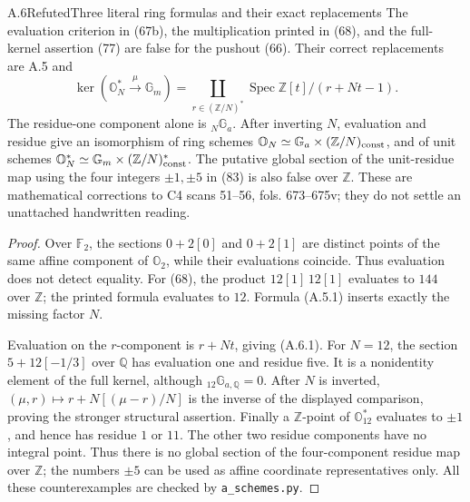 \begin{statement}{A.6}{Refuted}{Three literal ring formulas and their exact replacements}
The evaluation criterion in (67b), the multiplication printed in (68),
and the full-kernel assertion (77) are false for the pushout (66).
Their correct replacements are A.5 and
\[
 \ker(\mathbb O_N^*\xrightarrow{\mu}\mathbb G_m)
 =\coprod_{r\in(\mathbb Z/N)^*}
   \operatorname{Spec}\mathbb Z[t]/(r+Nt-1).           \tag{A.6.1}
\]
The residue-one component alone is ${}_N\mathbb G_a$.
After inverting $N$, evaluation and residue give an isomorphism of
ring schemes
$\mathbb O_N\simeq\mathbb G_a\times(\mathbb Z/N)_{\rm const}$,
and of unit schemes
$\mathbb O_N^*\simeq\mathbb G_m\times(\mathbb Z/N)^*_{\rm const}$.
The putative global section of the unit-residue map using the four
integers $\pm1,\pm5$ in (83) is also false over $\mathbb Z$.
These are mathematical corrections to C4 scans 51--56, fols. 673--675v;
they do not settle an unattached handwritten reading.
\end{statement}
\begin{proof}
Over $\mathbb F_2$, the sections $0+2[0]$ and $0+2[1]$ are distinct
points of the same affine component of $\mathbb O_2$, while their
evaluations coincide. Thus evaluation does not detect equality.
For (68), the product $12[1]\,12[1]$ evaluates to $144$ over
$\mathbb Z$; the printed formula evaluates to $12$. Formula (A.5.1)
inserts exactly the missing factor $N$.

Evaluation on the $r$-component is $r+Nt$, giving (A.6.1).
For $N=12$, the section $5+12[-1/3]$ over $\mathbb Q$ has evaluation
one and residue five. It is a nonidentity element of the full kernel,
although ${}_{12}\mathbb G_{a,\mathbb Q}=0$. After $N$ is inverted,
$(\mu,r)\mapsto r+N[(\mu-r)/N]$ is the inverse of the displayed
comparison, proving the stronger structural assertion.
Finally a $\mathbb Z$-point of $\mathbb O_{12}^*$ evaluates to
$\pm1$, and hence has residue $1$ or $11$. The other two residue
components have no integral point. Thus there is no global section
of the four-component residue map over $\mathbb Z$; the numbers
$\pm5$ can be used as affine coordinate representatives only.
All these counterexamples are checked by \texttt{a\_schemes.py}.
\end{proof}

